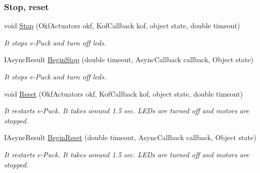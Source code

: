 \subsubsection*{Stop, reset} %
\label{ssub:Stop and reset}
  \begin{DoxyCompactItemize}

  \item void \hyperlink{class_elib_1_1_epuck_a6c5b0e61b183ae36e78251e51e32bdd3}{Stop} (OkfActuators okf, KofCallback kof, object state, double timeout)
  \begin{DoxyCompactList}\small\item\em It stops e-\/Puck and turn off leds. \item\end{DoxyCompactList}

  \item   IAsyncResult \hyperlink{class_elib_1_1_epuck_a4b66f73064942aa5736dca815a427d01}{BeginStop} (double timeout, AsyncCallback callback, Object state)
  \begin{DoxyCompactList}\small\item\em It stops e-\/Puck and turn off leds. \item\end{DoxyCompactList}

  \item void \hyperlink{class_elib_1_1_epuck_a36714362701622796cf01480ea4f8d32}{Reset} (OkfActuators okf, KofCallback kof, object state, double timeout)
  \begin{DoxyCompactList}\small\item\em It restarts e-\/Puck. It takes around 1.5 sec. LEDs are turned off and motors are stopped. \item\end{DoxyCompactList}

  \item   IAsyncResult \hyperlink{class_elib_1_1_epuck_a2b73b814db861ed276587db2fc124244}{BeginReset} (double timeout, AsyncCallback callback, Object state)
  \begin{DoxyCompactList}\small\item\em It restarts e-\/Puck. It takes around 1.5 sec. LEDs are turned off and motors are stopped. \item\end{DoxyCompactList} 

  \end{DoxyCompactItemize}

